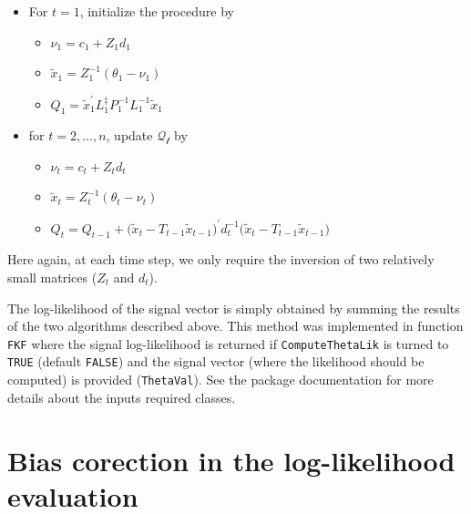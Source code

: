 \documentclass{article}
\begin{document}
\begin{itemize}
\item For $t=1$, initialize the procedure by
  \begin{itemize}
  \item $\nu_1= c_1 + Z_1 d_1 $
  \item $\tilde{x}_1 = Z_1^{-1} (\theta_1 - \nu_1) $
  \item $ Q_1 = \tilde{x}_1^\prime L_1^{\ddag} P_1^{-1} L_1^{-1} \tilde{x}_1 $
  \end{itemize}
\item for $t=2,\dots,n$, update $\mathcal{Q_t} $ by
  \begin{itemize}
  \item $\nu_t= c_t + Z_t d_t $
  \item $\tilde{x}_t = Z_t^{-1} (\theta_t - \nu_t) $
  \item $ Q_t = Q_{t-1} + \Big ( \tilde{x}_t - T_{t-1} \tilde{x}_{t-1} \Big )^\prime d_{t}^{-1} \Big ( \tilde{x}_t - T_{t-1} \tilde{x}_{t-1} \Big ) $
  \end{itemize}
\end{itemize}
Here again, at each time step, we only require the inversion of two relatively small matrices
($Z_t$ and $d_t$).

The log-likelihood of the signal vector is simply obtained by summing the results of the two
algorithms described above. This method was implemented in function \texttt{FKF} where the
signal log-likelihood is returned if \texttt{ComputeThetaLik} is turned to \texttt{TRUE}
(default \texttt{FALSE}) and the signal vector (where the likelihood should be computed) is
provided (\texttt{ThetaVal}). See the package documentation for more details about the inputs
required classes.


\section{Bias corection in the log-likelihood evaluation}
\label{App:logLikBias}
\end{document}
